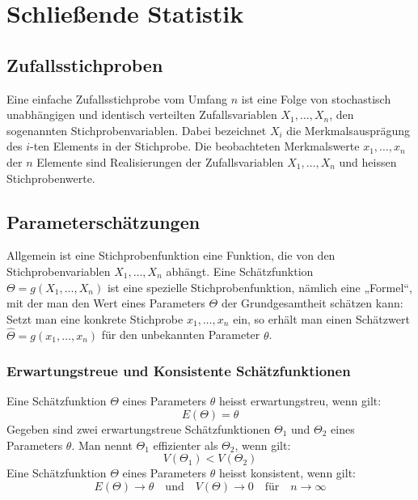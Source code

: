\section{Schließende Statistik}
\label{sec:schliessende_statistik}
\subsection{Zufallsstichproben}
\label{sec:zufallsstichproben}
Eine einfache Zufallsstichprobe vom Umfang $n$ ist eine Folge von stochastisch unabhängigen und identisch verteilten Zufallsvariablen
$X_1, \ldots, X_n$, den sogenannten Stichprobenvariablen. Dabei bezeichnet $X_i$ die Merkmalsausprägung des $i$-ten Elements in der Stichprobe.
Die beobachteten Merkmalswerte $x_1,\dots,x_n$ der $n$ Elemente sind Realisierungen der Zufallsvariablen $X_1,\dots,X_n$ und heissen Stichprobenwerte.
\subsection{Parameterschätzungen}
\label{sec:parameterschaetzungen}
Allgemein ist eine Stichprobenfunktion eine Funktion, die von den Stichprobenvariablen $X_1, \ldots, X_n$ abhängt. 
Eine Schätzfunktion $\Theta = g(X_1, \ldots, X_n)$ ist eine spezielle Stichprobenfunktion, nämlich eine „Formel“, mit der man den Wert eines Parameters
$\Theta$ der Grundgesamtheit schätzen kann: Setzt man eine konkrete Stichprobe $x_1, \dots, x_n$ ein, so erhält man einen Schätzwert 
$\hat{\Theta} = g(x_1, \dots, x_n)$ für den unbekannten Parameter $\theta$.
\subsubsection{Erwartungstreue und Konsistente Schätzfunktionen}
\label{sec:erwartungstreue_schaetzfunktionen}
Eine Schätzfunktion $\Theta$ eines Parameters $\theta$ heisst erwartungstreu, wenn gilt:
\begin{equation*}
    E(\Theta) = \theta
\end{equation*}
Gegeben sind zwei erwartungstreue Schätzfunktionen $\Theta_1$ und $\Theta_2$ eines Parameters $\theta$. Man nennt $\Theta_1$ effizienter als $\Theta_2$, wenn gilt:
\begin{equation*}
    V(\Theta_1) < V(\Theta_2)
\end{equation*}
Eine Schätzfunktion $\Theta$ eines Parameters $\theta$ heisst konsistent, wenn gilt:
\begin{equation*}
    E(\Theta) \rightarrow \theta \quad \text{und} \quad V(\Theta) \rightarrow 0 \quad \text{für} \quad n \rightarrow \infty
\end{equation*}
